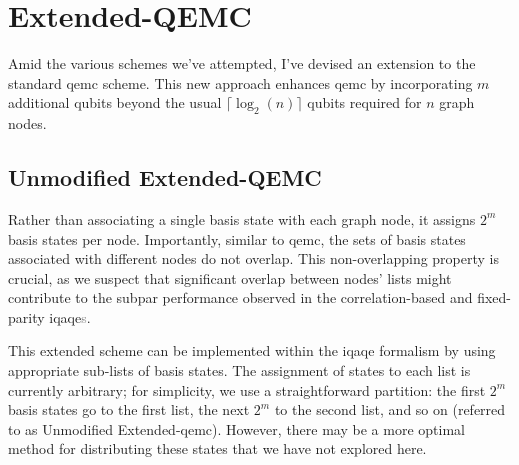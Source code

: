 










\section{Extended-QEMC}
\label{section:Extended_QEMC}


Amid the various schemes we've attempted, I've devised an extension to the standard \acrshort{qemc} scheme. This new approach enhances \acrshort{qemc} by incorporating $m$ additional qubits beyond the usual $\lceil\log_2(n)\rceil$ qubits required for $n$ graph nodes.

\subsection{Unmodified Extended-QEMC}
\label{subsection:Vanilla_Extended_QEMC}

Rather than associating a single basis state with each graph node, it assigns $2^m$ basis states per node. Importantly, similar to \acrshort{qemc}, the sets of basis states associated with different nodes do not overlap. This non-overlapping property is crucial, as we suspect that significant overlap between nodes' lists might contribute to the subpar performance observed in the correlation-based and fixed-parity \acrshort{iqaqe}\textcolor{gray}{s}.

This extended scheme can be implemented within the \acrshort{iqaqe} formalism by using appropriate sub-lists of basis states. The assignment of states to each list is currently arbitrary; for simplicity, we use a straightforward partition: the first $2^m$ basis states go to the first list, the next $2^m$ to the second list, and so on (referred to as Unmodified Extended-\acrshort{qemc}). However, there may be a more optimal method for distributing these states that we have not explored here.

